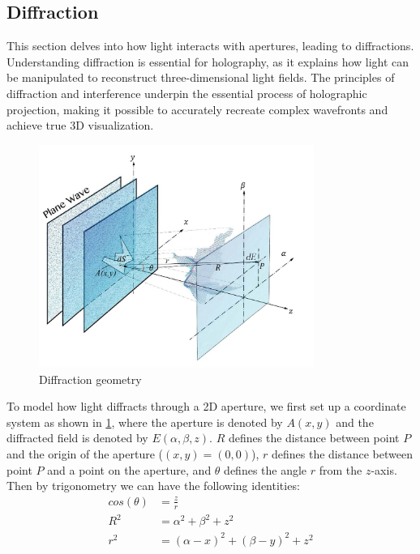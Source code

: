 \subsection{Diffraction}

This section delves into how light interacts with apertures, leading to diffractions. Understanding diffraction is essential for holography, as it explains how light can be manipulated to reconstruct three-dimensional light fields. The principles of diffraction and interference underpin the essential process of holographic projection, making it possible to accurately recreate complex wavefronts and achieve true 3D visualization.

\begin{figure}[H]
  \centering
  \includegraphics[width=0.8\textwidth]{diffraction_coordinate_definition.jpg}
  \caption{Diffraction geometry}\label{fig:diffraction_coordinate_definition}
\end{figure}

To model how light diffracts through a 2D aperture, we first set up a coordinate system as shown in \cref{fig:diffraction_coordinate_definition}, where the aperture is denoted by $A(x, y)$ and the diffracted field is denoted by $E(\alpha, \beta, z)$. $R$ defines the distance between point $P$ and the origin of the aperture ($(x,y)=(0,0)$), $r$ defines the distance between point $P$ and a point on the aperture, and $\theta$ defines the angle $r$ from the $z$-axis. Then by trigonometry we can have the following identities:
\begin{align}
  cos(\theta) & = \frac{z}{r}                      \label{eq:trignometry-theta} \\
  R^2         & = \alpha ^2 + \beta ^2 + z^2       \label{eq:trignometry-R} \\
  r^2         & = (\alpha-x)^2 + (\beta-y)^2 + z^2 \label{eq:trignometry-r}
\end{align}

